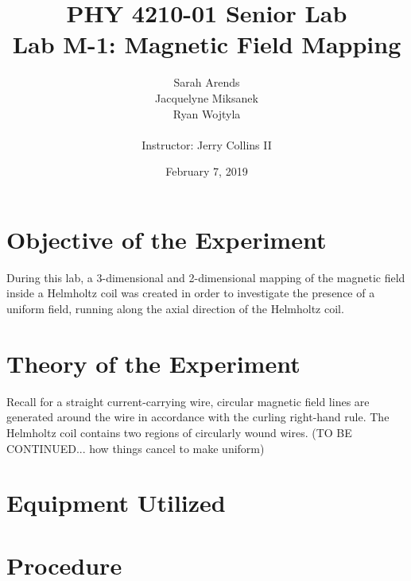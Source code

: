 \documentclass[a4paper]{article}
\title{PHY 4210-01 Senior Lab \\Lab M-1: Magnetic Field Mapping}
\author{Sarah Arends \\ 
        Jacquelyne Miksanek \\
        Ryan Wojtyla \\ \\
        Instructor: Jerry Collins II}
\date{February 7, 2019}
\begin{document}
\maketitle 

\begin{abstract}
\end{abstract}

\newpage

\tableofcontents

\newpage

\section{Objective of the Experiment}
During this lab, a 3-dimensional and 2-dimensional mapping of the magnetic field inside a Helmholtz coil was created in order to investigate the presence of a uniform field, running along the axial direction of the Helmholtz coil. 
\section{Theory of the Experiment}

Recall for a straight current-carrying wire, circular magnetic field lines are generated around the wire in accordance with the curling right-hand rule. The Helmholtz coil contains two regions of circularly wound wires. (TO BE CONTINUED... how things cancel to make uniform)

\section{Equipment Utilized}

\begin{figure}[h]
\centering
\label{diagram}
\end{figure}


\section{Procedure}
\end{document}
